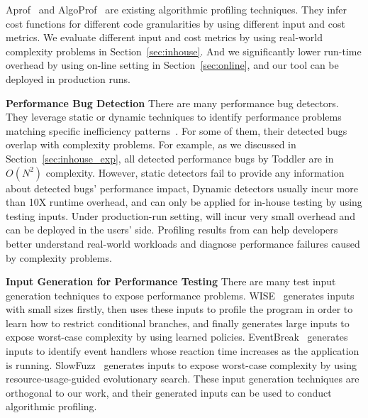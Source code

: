 Aprof~\cite{Aprof1, Aprof2} and AlgoProf~\cite{AlgoProf} are existing 
algorithmic profiling techniques.
They infer cost functions for different code granularities 
by using different input and cost metrics.
We evaluate different input and cost metrics 
by using real-world complexity problems in Section~\ref{sec:inhouse}.
And we significantly lower run-time overhead by using on-line setting in Section~\ref{sec:online},
and our tool can be deployed in production runs. 

\noindent\textbf{Performance Bug Detection}
There are many performance bug detectors.
They leverage static or dynamic techniques to 
identify performance problems matching specific inefficiency 
patterns~\cite{yufei-perf,CLARITY,xiao13:context,PerfBug,Alabama,CARAMEL,XuDataStructure,XuBloatPLDI2009,XuBloatPLDI2010,Cachetor,LoopInvariant,falsesharing}.
For some of them, their detected bugs overlap with complexity problems. 
For example, as we discussed in Section~\ref{sec:inhouse_exp},
all detected performance bugs by Toddler are in $O(N^2)$ complexity. 
However, static detectors fail to provide any information 
about detected bugs' performance impact,
Dynamic detectors usually incur more than 10X runtime overhead,
and can only be applied for in-house testing by using testing inputs. 
Under production-run setting, 
\Tool will incur very small overhead and can be deployed in the users' side. 
Profiling results from \Tool can help developers better
understand real-world workloads and diagnose performance failures caused by complexity problems. 


\noindent\textbf{Input Generation for Performance Testing}
There are many test input generation techniques to expose performance problems.
WISE~\cite{WISE} generates inputs with small sizes firstly, 
then uses these inputs to profile the program in order to learn how to restrict conditional branches, 
and finally generates large inputs to expose worst-case complexity by using learned policies. 
EventBreak~\cite{EventBreak} generates inputs to identify 
event handlers whose reaction time increases as the application is running. 
SlowFuzz~\cite{slowfuzz} generates inputs to expose worst-case complexity by using
resource-usage-guided evolutionary search. 
These input generation techniques are orthogonal to our work, 
and their generated inputs can be used to conduct algorithmic profiling. 

